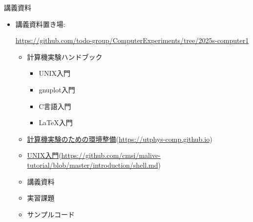 \begin{frame}[t]{講義資料}
  \begin{itemize}
  \item 講義資料置き場:
  
    {\footnotesize \href{https://github.com/todo-group/ComputerExperiments/tree/2025s-computer1}{https://github.com/todo-group/ComputerExperiments/tree/2025s-computer1}}
    \begin{itemize}
    \item 計算機実験ハンドブック
      \begin{itemize}
      \item UNIX入門
      \item gnuplot入門
      \item C言語入門
      \item \LaTeX 入門
      \end{itemize}
    \item \href{https://utphys-comp.github.io}{計算機実験のための環境整備}({\small \href{https://utphys-comp.github.io}{https://utphys-comp.github.io}})
    \item \href{https://github.com/cmsi/malive-tutorial/blob/master/introduction/shell.md}{UNIX入門}({\small \href{https://github.com/cmsi/malive-tutorial/blob/master/introduction/shell.md}{https://github.com/cmsi/malive-tutorial/blob/master/introduction/shell.md}})
    \item 講義資料
    \item 実習課題
    \item サンプルコード
    \end{itemize}
  \end{itemize}
\end{frame}

